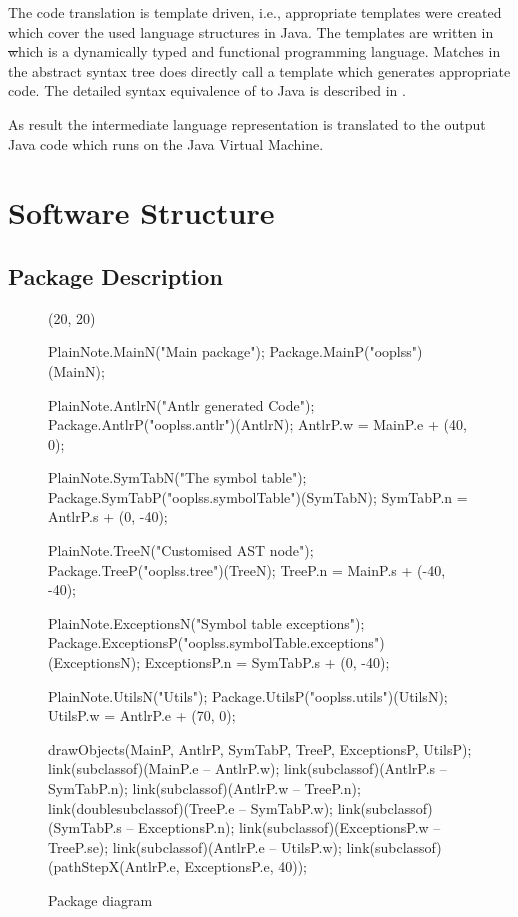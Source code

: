The code translation is template driven, i.e., appropriate templates
were created which cover the used language structures in Java. The
templates are written in \st which is a dynamically typed and functional
programming language. Matches in the abstract syntax tree does directly
call a template which generates appropriate code. The detailed syntax
equivalence of \ooplss to Java is described in .

As result the intermediate language representation is translated to the
output Java code which runs on the Java Virtual Machine.

\section{Software Structure}

\subsection{Package Description}

\begin{figure}[H]
\centering
	\begin{emp}[classdiag](20, 20)

	PlainNote.MainN("Main package");
	Package.MainP("ooplss")(MainN);

	PlainNote.AntlrN("Antlr generated Code");
	Package.AntlrP("ooplss.antlr")(AntlrN);
	AntlrP.w = MainP.e + (40, 0);

	PlainNote.SymTabN("The symbol table");
	Package.SymTabP("ooplss.symbolTable")(SymTabN);
	SymTabP.n = AntlrP.s + (0, -40);

	PlainNote.TreeN("Customised AST node");
	Package.TreeP("ooplss.tree")(TreeN);
	TreeP.n = MainP.s + (-40, -40);

	PlainNote.ExceptionsN("Symbol table exceptions");
	Package.ExceptionsP("ooplss.symbolTable.exceptions")(ExceptionsN);
	ExceptionsP.n = SymTabP.s + (0, -40);

	PlainNote.UtilsN("Utils");
	Package.UtilsP("ooplss.utils")(UtilsN);
	UtilsP.w = AntlrP.e + (70, 0);

	drawObjects(MainP, AntlrP, SymTabP, TreeP, ExceptionsP, UtilsP);
	link(subclassof)(MainP.e -- AntlrP.w);
	link(subclassof)(AntlrP.s -- SymTabP.n);
	link(subclassof)(AntlrP.w -- TreeP.n);
	link(doublesubclassof)(TreeP.e -- SymTabP.w);
	link(subclassof)(SymTabP.s -- ExceptionsP.n);
	link(subclassof)(ExceptionsP.w -- TreeP.se);
	link(subclassof)(AntlrP.e -- UtilsP.w);
	link(subclassof)(pathStepX(AntlrP.e, ExceptionsP.e, 40));

	\end{emp}
	\caption{Package diagram}
	\label{fig:classes}
\end{figure}


